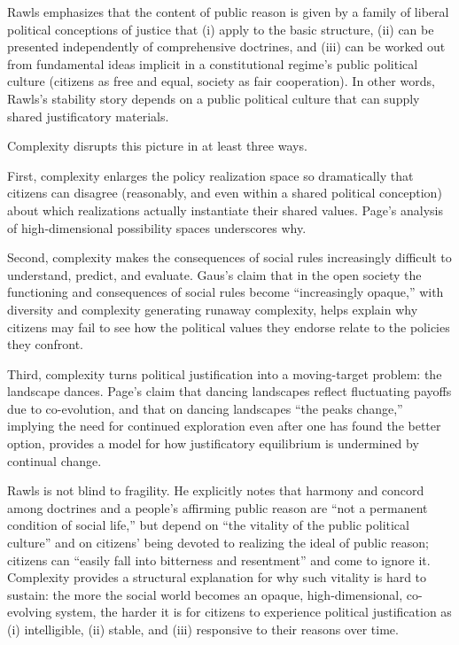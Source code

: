 \documentclass[12pt]{report}
\begin{document}
Rawls emphasizes that the content of public reason is given by a family of liberal political conceptions of justice that (i) apply to the basic structure, (ii) can be presented independently of comprehensive doctrines, and (iii) can be worked out from fundamental ideas implicit in a constitutional regime’s public political culture (citizens as free and equal, society as fair cooperation). \parencite[p.~453]{rawls2005political} In other words, Rawls’s stability story depends on a public political culture that can supply shared justificatory materials.

Complexity disrupts this picture in at least three ways.

First, complexity enlarges the policy realization space so dramatically that citizens can disagree (reasonably, and even within a shared political conception) about which realizations actually instantiate their shared values. Page’s analysis of high-dimensional possibility spaces underscores why. \parencite[p.~130]{page2011diversity}

Second, complexity makes the consequences of social rules increasingly difficult to understand, predict, and evaluate. Gaus’s claim that in the open society the functioning and consequences of social rules become “increasingly opaque,” with diversity and complexity generating runaway complexity, helps explain why citizens may fail to see how the political values they endorse relate to the policies they confront. \parencite[p.~102]{gaus2021open}

Third, complexity turns political justification into a moving-target problem: the landscape dances. Page’s claim that dancing landscapes reflect fluctuating payoffs due to co-evolution, and that on dancing landscapes “the peaks change,” implying the need for continued exploration even after one has found the better option, provides a model for how justificatory equilibrium is undermined by continual change. \parencite[pp.~94, 123]{page2011diversity}

Rawls is not blind to fragility. He explicitly notes that harmony and concord among doctrines and a people’s affirming public reason are “not a permanent condition of social life,” but depend on “the vitality of the public political culture” and on citizens’ being devoted to realizing the ideal of public reason; citizens can “easily fall into bitterness and resentment” and come to ignore it. \parencite[p.~485]{rawls2005political} Complexity provides a structural explanation for why such vitality is hard to sustain: the more the social world becomes an opaque, high-dimensional, co-evolving system, the harder it is for citizens to experience political justification as (i) intelligible, (ii) stable, and (iii) responsive to their reasons over time.
\end{document}
